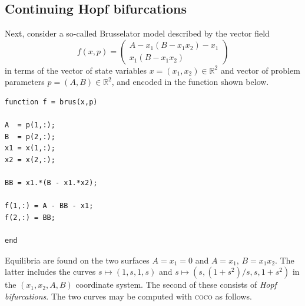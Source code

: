 \subsection{Continuing Hopf bifurcations}
\label{sec: Continuing Hopf bifurcations}
Next, consider a so-called Brusselator model described by the vector field 
\[
f(x,p)=\begin{pmatrix}A-x_1(B-x_1x_2)-x_1\\x_1(B-x_1x_2)\end{pmatrix}
\]
in terms of the vector of state variables $x=(x_1,x_2)\in\mathbb{R}^2$ and vector of problem parameters $p=(A,B)\in\mathbb{R}^2$, and encoded in the  function shown below.
\begin{lstlisting}[language=coco-highlight,frame=shadowbox]
function f = brus(x,p)

A  = p(1,:);
B  = p(2,:);
x1 = x(1,:);
x2 = x(2,:);

BB = x1.*(B - x1.*x2);

f(1,:) = A - BB - x1;
f(2,:) = BB;

end
\end{lstlisting}
Equilibria are found on the two surfaces $A=x_1=0$ and $A=x_1,\,B=x_1x_2$. The latter includes the curves $s\mapsto (1,s,1,s)$ and $s\mapsto(s,(1+s^2)/s,s,1+s^2)$ in the $(x_1,x_2,A,B)$ coordinate system. The second of these consists of \textit{Hopf bifurcations}. The two curves may be computed with \textsc{coco} as follows.
